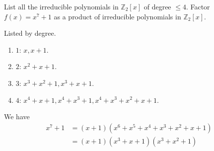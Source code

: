  \begin{exercise}[Shifrin 3.1.13]
    List all the irreducible polynomials in $\mathbb{Z}_2[x]$ of degree $\leq 4$. Factor $f(x) = x^7 + 1$ as a product of irreducible polynomials in $\mathbb{Z}_2[x]$.
  \end{exercise}
  \begin{solution}
    Listed by degree. 
    \begin{enumerate}
      \item $1$: $x, x + 1$. 
      \item $2$: $x^2 + x + 1$. 
      \item $3$: $x^3 + x^2 + 1, x^3 + x + 1$. 
      \item $4$: $x^4 + x + 1, x^4 + x^3 + 1, x^4 + x^3 + x^2 + x + 1$. 
    \end{enumerate}
    We have 
    \begin{align}
      x^7 + 1 & = (x + 1)(x^6 + x^5 + x^4 + x^3 + x^2 + x + 1) \\
              & = (x + 1) (x^3 + x + 1) (x^3 + x^2 + 1)
    \end{align}
  \end{solution}


